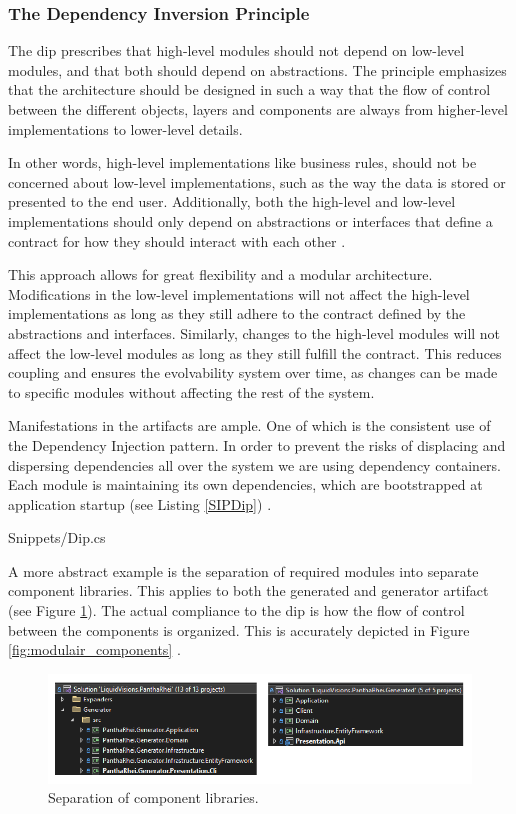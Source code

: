 \subsubsection{The Dependency Inversion Principle} \label{subsubsec:dip} 

The \gls{dip} prescribes that high-level modules should not depend on low-level modules,
and that both should depend on abstractions. The principle emphasizes that the
architecture should be designed in such a way that the flow of control between the
different objects, layers and components are always from higher-level implementations
to lower-level details.

In other words, high-level implementations like business rules, should not be concerned
about low-level implementations, such as the way the data is stored or presented to the
end user. Additionally, both the high-level and low-level implementations should only
depend on abstractions or interfaces that define a contract for how they should interact
with each other \parencite[109]{robert_c_martin_clean_2018}.

This approach allows for great flexibility and a modular architecture. Modifications in
the low-level implementations will not affect the high-level implementations as long as
they still adhere to the contract defined by the abstractions and interfaces.
Similarly, changes to the high-level modules will not affect the low-level modules as long
as they still fulfill the contract. This reduces coupling and ensures the evolvability
system over time, as changes can be made to specific modules without affecting the rest of
the system.

Manifestations in the artifacts are ample. One of which is the consistent use of the
Dependency Injection pattern. In order to prevent the risks of displacing and dispersing
dependencies all over the system \parencite[214]{mannaert_normalized_2016} we are using
dependency containers. Each module is maintaining its own dependencies, which are
bootstrapped at application startup (see Listing \ref{SIPDip})
\parencite{koks_generator_2023}.


    {Snippets/Dip.cs}

A more abstract example is the separation of required modules into separate component
libraries. This applies to both the generated and generator artifact (see Figure
\ref{fig:solutions}). The actual compliance to the \gls{dip} is how the flow of control
between the components is organized. This is accurately depicted in Figure
\ref{fig:modulair_components} .

\begin{figure}[H]
    \centering
    \includegraphics[width=1\textwidth]{Figures/solutions.pdf}
    \caption[modularity]{Separation of component libraries.}
    \label{fig:solutions}
\end{figure}